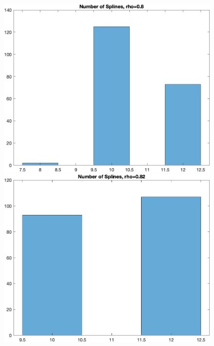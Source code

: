 \documentclass[
]{article}
\begin{document}
\begin{figure}

\begin{minipage}{0.50\linewidth}
\includegraphics{../figures/hist_n_spli_rho-0.8_finer_grid.png}\end{minipage}%
%
\begin{minipage}{0.50\linewidth}
\includegraphics{../figures/hist_n_spli_rho-0.82_finer_grid.png}\end{minipage}%
\newline
\begin{minipage}{0.50\linewidth}

\end{minipage}
\end{figure}
\end{document}
